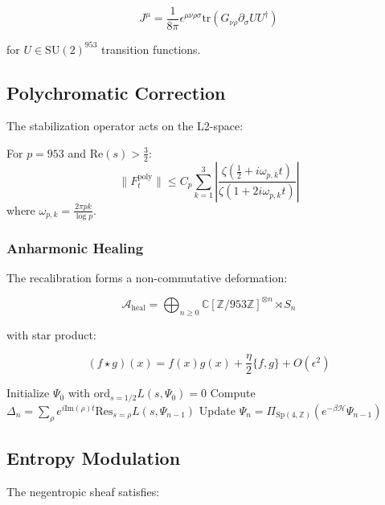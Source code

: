 \documentclass[12pt]{article}
\begin{document}
\begin{equation}
J^\mu = \frac{1}{8\pi}\epsilon^{\mu\nu\rho\sigma}\text{tr}(G_{\nu\rho}\partial_\sigma U U^\dagger)
\end{equation}

for $U \in \text{SU}(2)^{953}$ transition functions.

\subsection{Polychromatic Correction}
The stabilization operator acts on the L2-space:

\begin{theorem}
For $p=953$ and $\text{Re}(s) > \frac{3}{2}$:
\begin{equation}
\|F^{\text{poly}}_t\| \leq C_p \sum_{k=1}^3 \left|\frac{\zeta(\frac{1}{2} + i\omega_{p,k}t)}{\zeta(1 + 2i\omega_{p,k}t)}\right|
\end{equation}
where $\omega_{p,k} = \frac{2\pi pk}{\log p}$.
\end{theorem}

\subsubsection{Anharmonic Healing}
The recalibration forms a non-commutative deformation:

\begin{equation}
\mathcal{A}_\text{heal} = \bigoplus_{n\geq0} \mathbb{C}[\mathbb{Z}/953\mathbb{Z}]^{\otimes n} \rtimes S_n
\end{equation}

with star product:

\begin{equation}
(f \star g)(x) = f(x)g(x) + \frac{\eta}{2}\{f,g\} + O(\epsilon^2)
\end{equation}

\begin{algorithm}[H]
\caption{Spectral Fault Synchronization}
\begin{algorithmic}[1]
\STATE Initialize $\Psi_0$ with $\text{ord}_{s=1/2}L(s,\Psi_0)=0$
\STATE Compute $\Delta_n = \sum_{\rho} e^{i\text{Im}(\rho)t}\text{Res}_{s=\rho}L(s,\Psi_{n-1})$
\STATE Update $\Psi_n = \Pi_{\text{Sp}(4,\mathbb{Z})}\left(e^{-\beta\mathcal{H}}\Psi_{n-1}\right)$
\ENDFOR
\end{algorithmic}
\end{algorithm}

\subsection{Entropy Modulation}
The negentropic sheaf satisfies:
\end{document}
